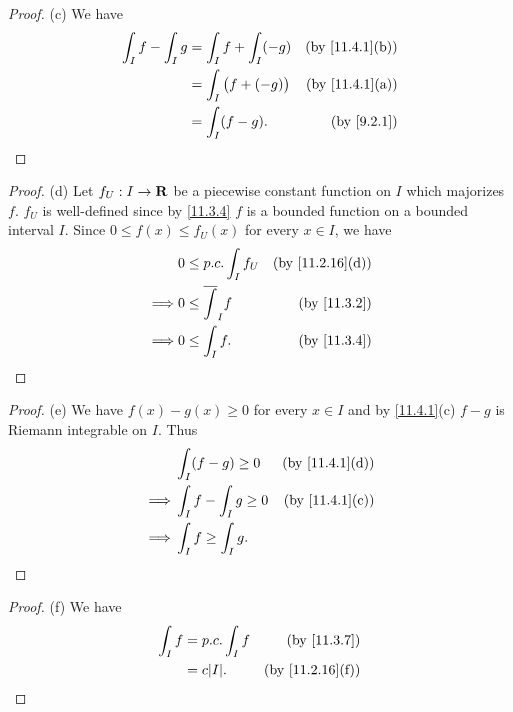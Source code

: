 \begin{proof}{(c)}
  We have
  \begin{align*}
    \int_I f - \int_I g & = \int_I f + \int_I (-g)    & \text{(by \cref{11.4.1}(b))} \\
                        & = \int_I \big(f + (-g)\big) & \text{(by \cref{11.4.1}(a))} \\
                        & = \int_I (f - g).           & \text{(by \cref{9.2.1})}
  \end{align*}
\end{proof}

\begin{proof}{(d)}
  Let \(f_U : I \to \mathbf{R}\) be a piecewise constant function on \(I\) which majorizes \(f\).
  \(f_U\) is well-defined since by \cref{11.3.4} \(f\) is a bounded function on a bounded interval \(I\).
  Since \(0 \leq f(x) \leq f_U(x)\) for every \(x \in I\), we have
  \begin{align*}
             & 0 \leq p.c. \int_I f_U     & \text{(by \cref{11.2.16}(d))} \\
    \implies & 0 \leq \overline{\int}_I f & \text{(by \cref{11.3.2})}     \\
    \implies & 0 \leq \int_I f.           & \text{(by \cref{11.3.4})}
  \end{align*}
\end{proof}

\begin{proof}{(e)}
  We have \(f(x) - g(x) \geq 0\) for every \(x \in I\) and by \cref{11.4.1}(c) \(f - g\) is Riemann integrable on \(I\).
  Thus
  \begin{align*}
             & \int_I (f - g) \geq 0      & \text{(by \cref{11.4.1}(d))} \\
    \implies & \int_I f - \int_I g \geq 0 & \text{(by \cref{11.4.1}(c))} \\
    \implies & \int_I f \geq \int_I g.
  \end{align*}
\end{proof}

\begin{proof}{(f)}
  We have
  \begin{align*}
    \int_I f & = p.c. \int_I f & \text{(by \cref{11.3.7})}     \\
             & = c \abs{I}.    & \text{(by \cref{11.2.16}(f))}
  \end{align*}
\end{proof}


